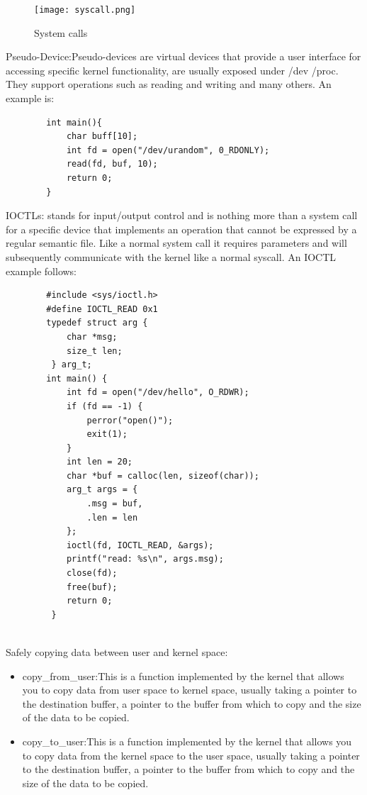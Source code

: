 \documentclass{report}
\begin{document}
    \begin{figure}[htbp]
        \centering
        \texttt{[image: syscall.png]}
        \caption{System calls}
        \label{fig:enter-label}
    \end{figure}
    \clearpage
    Pseudo-Device:Pseudo-devices are virtual devices that provide a user interface for accessing specific kernel functionality, are usually exposed under /dev /proc.\newline
    They support operations such as reading and writing and many others.
    An example is:
    \begin{verbatim}
        int main(){
            char buff[10];
            int fd = open("/dev/urandom", 0_RDONLY);
            read(fd, buf, 10);
            return 0;
        }
    \end{verbatim}
    IOCTLs: stands for input/output control and is nothing more than a system call for a specific device that implements an operation that cannot be expressed by a regular semantic file.\newline
    Like a normal system call it requires parameters and will subsequently communicate with the kernel like a normal syscall.\newline
    An IOCTL example follows: 
    \begin{verbatim}
        #include <sys/ioctl.h> 
        #define IOCTL_READ 0x1 
        typedef struct arg { 
            char *msg; 
            size_t len;
         } arg_t; 
        int main() { 
            int fd = open("/dev/hello", O_RDWR); 
            if (fd == -1) { 
                perror("open()"); 
                exit(1); 
            } 
            int len = 20; 
            char *buf = calloc(len, sizeof(char)); 
            arg_t args = { 
                .msg = buf, 
                .len = len 
            }; 
            ioctl(fd, IOCTL_READ, &args); 
            printf("read: %s\n", args.msg); 
            close(fd); 
            free(buf); 
            return 0; 
         }
    
    \end{verbatim}
    \clearpage
    Safely copying data between user and kernel space: 
    \begin{itemize}
        \item copy\_from\_user:This is a function implemented by the kernel that allows you to copy data from user space to kernel space, usually taking a pointer to the destination buffer, a pointer to the buffer from which to copy and the size of the data to be copied.\newline
        \item copy\_to\_user:This is a function implemented by the kernel that allows you to copy data from the kernel space to the user space, usually taking a pointer to the destination buffer, a pointer to the buffer from which to copy and the size of the data to be copied.\newline
    \end{itemize}
\end{document}

